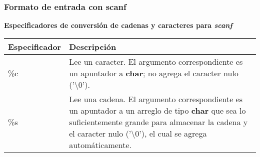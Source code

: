 \begin{frame}[t]
\frametitle{Formato de entrada con scanf}
\textbf{Especificadores de conversión de cadenas y caracteres para \textit{scanf}}\vspace{5mm}\\
\scriptsize
\centering
\begin{tabular}{lp{6cm}}
	\toprule
	\textbf{Especificador} & \textbf{Descripción}\\
	\midrule
	\%c & Lee un caracter. El argumento correspondiente es un apuntador a \textbf{char}; no agrega el caracter nulo ('\textbackslash0').\\
	\%s & Lee una cadena. El argumento correspondiente es un apuntador a un arreglo de tipo \textbf{char} que sea lo suficientemente grande para almacenar la cadena y el caracter nulo ('\textbackslash0'), el cual se agrega automáticamente. \\
	\bottomrule
\end{tabular}
\end{frame}